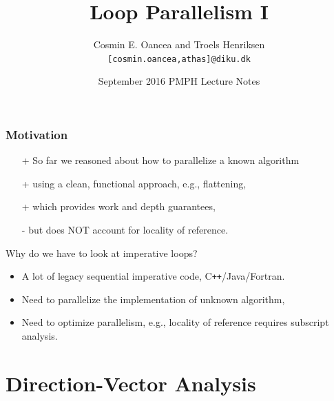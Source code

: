 \documentclass{beamer}
\title[Loop Parallelism]{Loop Parallelism I}
\author[C.~Oancea]{Cosmin E. Oancea and Troels Henriksen\\{\tt [cosmin.oancea,athas]@diku.dk}}
\institute{Department of Computer Science (DIKU)\\University of Copenhagen}
\date[Sept 2016]{September 2016 PMPH Lecture Notes}
\newcommand{\emp}[1]{\textcolor{DikuRed}{ #1}}
\begin{document}
\titleslide




\begin{frame}
  \frametitle{Motivation}

\begin{itemize}
    \item[+] So far we reasoned about how to parallelize a known algorithm
    \item[+] using a clean, functional approach, e.g., flattening, 
    \item[+] which provides work and depth guarantees,
    \item[\alert{-}] but does \alert{NOT} account for locality of reference.

\end  {itemize}\bigskip

\emp{Why do we have to look at imperative loops?}\pause
\begin{itemize}    
    \item A lot of legacy sequential imperative code, C{\tt++}/Java/Fortran.\medskip
    \item Need to parallelize the implementation of unknown algorithm,\medskip
    \item Need to optimize parallelism, e.g., locality of reference requires subscript analysis. 
\end  {itemize}  

\end{frame}


\section{Direction-Vector Analysis}

\begin{frame}[fragile]
	\tableofcontents[currentsection]
\end{frame}
\end{document}
